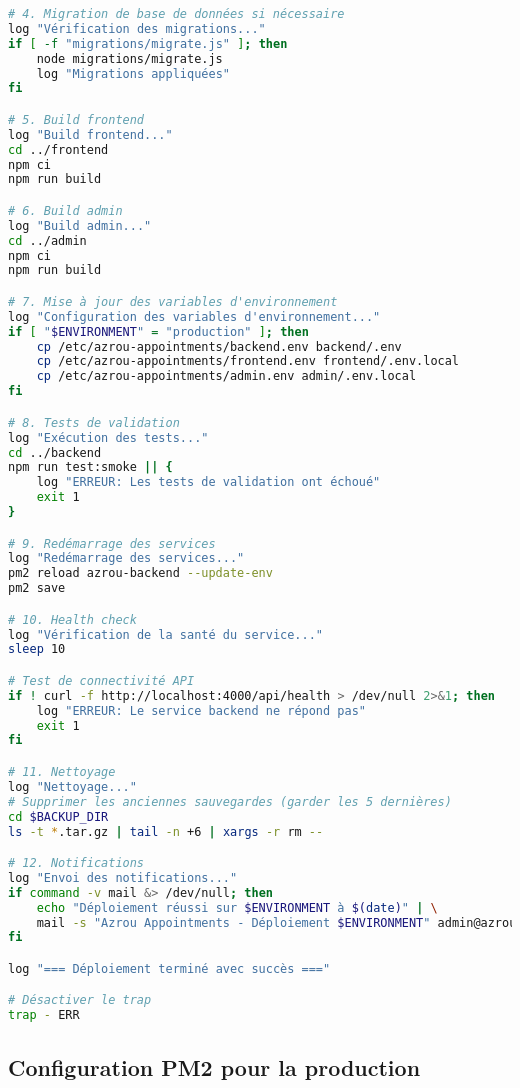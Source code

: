 \begin{lstlisting}[language=bash, caption=deploy.sh - Script de déploiement complet]
# 4. Migration de base de données si nécessaire
log "Vérification des migrations..."
if [ -f "migrations/migrate.js" ]; then
    node migrations/migrate.js
    log "Migrations appliquées"
fi

# 5. Build frontend
log "Build frontend..."
cd ../frontend
npm ci
npm run build

# 6. Build admin
log "Build admin..."
cd ../admin
npm ci
npm run build

# 7. Mise à jour des variables d'environnement
log "Configuration des variables d'environnement..."
if [ "$ENVIRONMENT" = "production" ]; then
    cp /etc/azrou-appointments/backend.env backend/.env
    cp /etc/azrou-appointments/frontend.env frontend/.env.local
    cp /etc/azrou-appointments/admin.env admin/.env.local
fi

# 8. Tests de validation
log "Exécution des tests..."
cd ../backend
npm run test:smoke || {
    log "ERREUR: Les tests de validation ont échoué"
    exit 1
}

# 9. Redémarrage des services
log "Redémarrage des services..."
pm2 reload azrou-backend --update-env
pm2 save

# 10. Health check
log "Vérification de la santé du service..."
sleep 10

# Test de connectivité API
if ! curl -f http://localhost:4000/api/health > /dev/null 2>&1; then
    log "ERREUR: Le service backend ne répond pas"
    exit 1
fi

# 11. Nettoyage
log "Nettoyage..."
# Supprimer les anciennes sauvegardes (garder les 5 dernières)
cd $BACKUP_DIR
ls -t *.tar.gz | tail -n +6 | xargs -r rm --

# 12. Notifications
log "Envoi des notifications..."
if command -v mail &> /dev/null; then
    echo "Déploiement réussi sur $ENVIRONMENT à $(date)" | \
    mail -s "Azrou Appointments - Déploiement $ENVIRONMENT" admin@azrou.ma
fi

log "=== Déploiement terminé avec succès ==="

# Désactiver le trap
trap - ERR
\end{lstlisting}

\subsection{Configuration PM2 pour la production}

